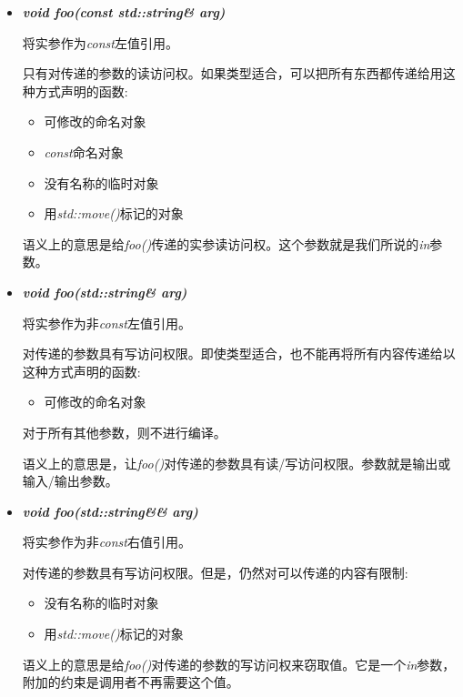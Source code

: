 \begin{itemize}
  \item \textit{\textbf{void foo(\allowbreak{}const std::\allowbreak{}string\& arg)\allowbreak{}}}\par
  将实参作为\textit{const}左值引用。\par
  只有对传递的参数的读访问权。如果类型适合，可以把所有东西都传递给用这种方式声明的函数:\par
  \begin{itemize}
    \item[-] 可修改的命名对象
    \item[-] \textit{const}命名对象
    \item[-] 没有名称的临时对象
    \item[-] 用\textit{std::move()}标记的对象
  \end{itemize}
  语义上的意思是给\textit{foo()}传递的实参读访问权。这个参数就是我们所说的\textit{in}参数。
  \item \textit{\textbf{void foo(\allowbreak{}std::\allowbreak{}string\& arg)\allowbreak{}}}\par
  将实参作为非\textit{const}左值引用。\par
  对传递的参数具有写访问权限。即使类型适合，也不能再将所有内容传递给以这种方式声明的函数:\par
  \begin{itemize}
    \item[-] 可修改的命名对象
  \end{itemize}
  对于所有其他参数，则不进行编译。\par
  语义上的意思是，让\textit{foo()}对传递的参数具有读/写访问权限。参数就是输出或输入/输出参数。\par
  \item \textit{\textbf{void foo(\allowbreak{}std::\allowbreak{}string\&\& arg)\allowbreak{}}}\par
  将实参作为非\textit{const}右值引用。\par
  对传递的参数具有写访问权限。但是，仍然对可以传递的内容有限制:\par
  \begin{itemize}
    \item[-] 没有名称的临时对象
    \item[-] 用\textit{std::move()}标记的对象
  \end{itemize}
  语义上的意思是给\textit{foo()}对传递的参数的写访问权来窃取值。它是一个\textit{in}参数，附加的约束是调用者不再需要这个值。
\end{itemize}

